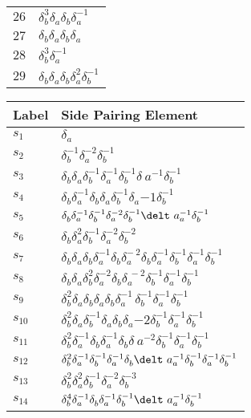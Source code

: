 \documentclass{article}
\begin{document}
\begin{center}
\begin{tabular}{ll}
$26$ & $\delta_b^{3}\delta_a^{}\delta_b^{}\delta_a^{-1}$ \\
$27$ & $\delta_b^{}\delta_a^{}\delta_b^{}\delta_a^{}$ \\
$28$ & $\delta_b^{3}\delta_a^{-1}$ \\
$29$ & $\delta_b^{}\delta_a^{}\delta_b^{}\delta_a^{2}\delta_b^{-1}$ \\
\bottomrule
\end{tabular}
\hfill
\begin{tabular}{ll}
\toprule
Label & Side Pairing Element\\
\midrule
$s_{1}$ & $\delta_a^{}$ \\
$s_{2}$ & $\delta_b^{-1}\delta_a^{-2}\delta_b^{-1}$ \\
$s_{3}$ & $\delta_b^{}\delta_a^{}\delta_b^{-1}\delta_a^{-1}\delta_b^{-1}\delta_\
a^{-1}\delta_b^{-1}$ \\
$s_{4}$ & $\delta_b^{}\delta_a^{-1}\delta_b^{}\delta_a^{}\delta_b^{-1}\delta_a^\
{-1}\delta_b^{-1}$ \\
$s_{5}$ & $\delta_b^{}\delta_a^{-1}\delta_b^{-1}\delta_a^{-2}\delta_b^{-1}\delt\
a_a^{-1}\delta_b^{-1}$ \\
$s_{6}$ & $\delta_b^{}\delta_a^{2}\delta_b^{-1}\delta_a^{-2}\delta_b^{-2}$ \\
$s_{7}$ & $\delta_b^{}\delta_a^{}\delta_b^{}\delta_a^{-1}\delta_b^{}\delta_a^{-\
2}\delta_b^{}\delta_a^{-1}\delta_b^{-1}\delta_a^{-1}\delta_b^{-1}$ \\
$s_{8}$ & $\delta_b^{}\delta_a^{}\delta_b^{2}\delta_a^{-2}\delta_b^{}\delta_a^{\
-2}\delta_b^{-1}\delta_a^{-1}\delta_b^{-1}$ \\
$s_{9}$ & $\delta_b^{2}\delta_a^{}\delta_b^{}\delta_a^{}\delta_b^{}\delta_a^{-1\
}\delta_b^{-1}\delta_a^{-1}\delta_b^{-1}$ \\
$s_{10}$ & $\delta_b^{2}\delta_a^{}\delta_b^{-1}\delta_a^{}\delta_b^{}\delta_a^\
{-2}\delta_b^{-1}\delta_a^{-1}\delta_b^{-1}$ \\
$s_{11}$ & $\delta_b^{2}\delta_a^{-1}\delta_b^{}\delta_a^{-1}\delta_b^{}\delta_\
a^{-2}\delta_b^{-1}\delta_a^{-1}\delta_b^{-1}$ \\
$s_{12}$ & $\delta_b^{2}\delta_a^{-1}\delta_b^{-1}\delta_a^{-1}\delta_b^{}\delt\
a_a^{-1}\delta_b^{-1}\delta_a^{-1}\delta_b^{-1}$ \\
$s_{13}$ & $\delta_b^{2}\delta_a^{2}\delta_b^{-1}\delta_a^{-2}\delta_b^{-3}$ \\
$s_{14}$ & $\delta_b^{4}\delta_a^{-1}\delta_b^{}\delta_a^{-1}\delta_b^{-1}\delt\
a_a^{-1}\delta_b^{-1}$ \\

\end{tabular}
\end{center}
\end{document}
